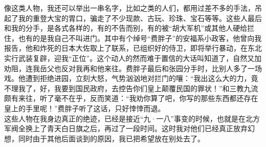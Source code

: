 像这类人物，我还可以举出一串名字，比如之类的人们，都用过差不多的手法，吊起了我的重登大宝的胃口，骗走了不少现款、古玩、珍珠、宝石等等。这些人最后和我的分手，是各式各样的，有的不告而别，有的被“胡大军机”或其他人硬给拦住，也有的是我自己不叫进门。其中有个绰号“费胖子”的安福系小政客，他曾向我报告，他和炸死的日本大佐取上了联系，已组织好的侍卫，即将举行暴动，在东北实行武装复辟，迎我“正位”。这个动人的然而难于置信的大话叫知道了，自然又加劝阻，连我岳父也反对我再和他来往。费胖子最后和张园分手时，比别人多了一场戏。他遭到拒绝进园，立刻大怒，气势汹汹地对拦门的嚷：“我出这么大的力，竟不理我了，好，我要到国民政府，去控告你们皇上颠覆民国的罪状！”和三教九流颇有来往，听了毫不在乎，反而笑道：“我劝你算了吧，你写的那些东西都还存在皇上的手里呢！”费胖子听了这话，只好悻悻而退。\\

这些人物在我身边真正的绝迹，已经是接近“九·一八”事变的时候，也就是在北方军阀全换上了青天白日旗之后，再过了一段时间。这时我对他们已经真正放弃幻想，同时由于其他后面谈到的原因，我已把希望放在别处去了。
